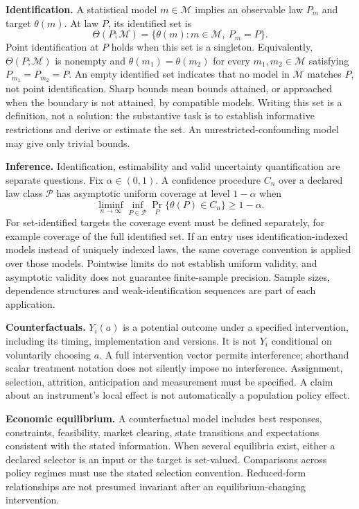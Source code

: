 \documentclass[11pt,a4paper]{article}
\begin{document}
\textbf{Identification.} A statistical model $m\in\mathcal M$ implies an observable law $P_m$ and target $\theta(m)$. At law $P$, its identified set is
\[
\Theta(P;\mathcal M)=\{\theta(m):m\in\mathcal M,\ P_m=P\}.
\]
Point identification at $P$ holds when this set is a singleton. Equivalently, $\Theta(P;\mathcal M)$ is nonempty and $\theta(m_1)=\theta(m_2)$ for every $m_1,m_2\in\mathcal M$ satisfying $P_{m_1}=P_{m_2}=P$. An empty identified set indicates that no model in $\mathcal M$ matches $P$, not point identification. Sharp bounds mean bounds attained, or approached when the boundary is not attained, by compatible models. Writing this set is a definition, not a solution: the substantive task is to establish informative restrictions and derive or estimate the set. An unrestricted-confounding model may give only trivial bounds.

\textbf{Inference.} Identification, estimability and valid uncertainty quantification are separate questions. Fix $\alpha\in(0,1)$. A confidence procedure $C_n$ over a declared law class $\mathcal P$ has asymptotic uniform coverage at level $1-\alpha$ when
\[
\liminf_{n\to\infty}\inf_{P\in\mathcal P}\Pr_P\{\theta(P)\in C_n\}\geq1-\alpha.
\]
For set-identified targets the coverage event must be defined separately, for example coverage of the full identified set. If an entry uses identification-indexed models instead of uniquely indexed laws, the same coverage convention is applied over those models. Pointwise limits do not establish uniform validity, and asymptotic validity does not guarantee finite-sample precision. Sample sizes, dependence structures and weak-identification sequences are part of each application.

\textbf{Counterfactuals.} $Y_i(a)$ is a potential outcome under a specified intervention, including its timing, implementation and versions. It is not $Y_i$ conditional on voluntarily choosing $a$. A full intervention vector permits interference; shorthand scalar treatment notation does not silently impose no interference. Assignment, selection, attrition, anticipation and measurement must be specified. A claim about an instrument's local effect is not automatically a population policy effect.

\textbf{Economic equilibrium.} A counterfactual model includes best responses, constraints, feasibility, market clearing, state transitions and expectations consistent with the stated information. When several equilibria exist, either a declared selector is an input or the target is set-valued. Comparisons across policy regimes must use the stated selection convention. Reduced-form relationships are not presumed invariant after an equilibrium-changing intervention.
\end{document}
